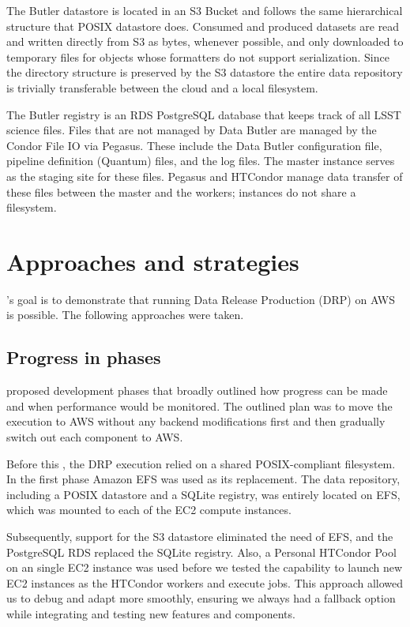 The Butler datastore is located in an S3 Bucket and follows the same hierarchical structure that POSIX datastore does.
Consumed and produced datasets are read and written directly from S3 as bytes, whenever possible, and only downloaded to temporary files for objects whose formatters do not support serialization.
Since the directory structure is preserved by the S3 datastore the entire data repository is trivially transferable between the cloud and a local filesystem.

The Butler registry is an RDS PostgreSQL database that keeps track of all LSST science files.
Files that are not managed by Data Butler are managed by the Condor File IO via Pegasus.
These include the Data Butler configuration file, pipeline definition (Quantum) files, and the log files.
The master instance serves as the staging site for these files.
Pegasus and HTCondor manage data transfer of these files between the master and the workers; instances do not share a filesystem.


\section{Approaches and strategies} \label{sec:approach}

\poc's goal is to demonstrate that running Data Release Production (DRP) on AWS is possible.
The following approaches were taken.

\subsection{Progress in phases}

 proposed development phases that broadly outlined how progress can be made and when performance would be monitored.
The outlined plan was to move the execution to AWS without any backend modifications first and then gradually switch out each component to AWS.

Before this \poc, the DRP execution relied on a shared POSIX-compliant filesystem.
In the first phase Amazon EFS was used as its replacement.
The data repository, including a POSIX datastore and a SQLite registry, was entirely located on EFS, which was mounted to each of the EC2 compute instances.

Subsequently, support for the S3 datastore eliminated the need of EFS, and the PostgreSQL RDS replaced the SQLite registry.
Also, a Personal HTCondor Pool on an single EC2 instance was used before we tested the capability to launch new EC2 instances as the HTCondor workers and execute jobs.
This approach allowed us to debug and adapt more smoothly, ensuring we always had a fallback option while integrating and testing new features and components.

